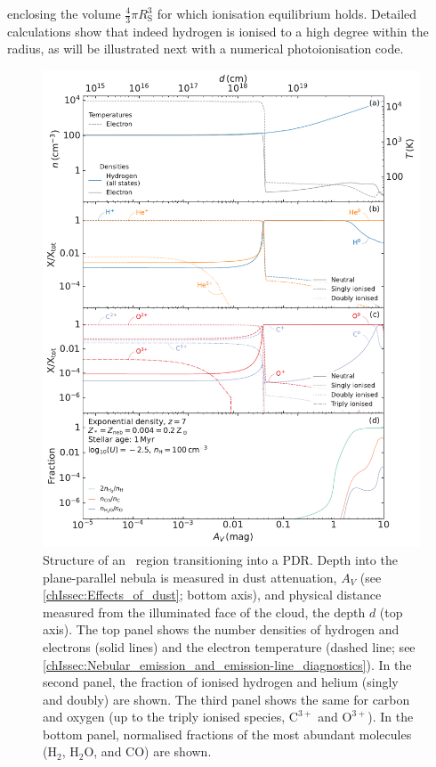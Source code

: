 \noindent enclosing the volume $\frac{4}{3} \pi R_\text{S}^3$ for which ionisation equilibrium holds. Detailed calculations show that indeed hydrogen is ionised to a high degree within the \citeauthor{1939ApJ....89..526S} radius, as will be illustrated next with a numerical photoionisation code.
\begin{figure}
    \centering
    \includegraphics[width=0.95\linewidth]{"Figs/Cloudy_PDR_structure"}
    \caption[Structure of an \HII\ region transitioning into a PDR]
    {Structure of an \HII\ region transitioning into a PDR. Depth into the plane-parallel nebula is measured in dust attenuation, $A_V$ (see \cref{chIssec:Effects_of_dust}; bottom axis), and physical distance measured from the illuminated face of the cloud, the depth $d$ (top axis). The top panel shows the number densities of hydrogen and electrons (solid lines) and the electron temperature (dashed line; see \cref{chIssec:Nebular_emission_and_emission-line_diagnostics}). In the second panel, the fraction of ionised hydrogen and helium (singly and doubly) are shown. The third panel shows the same for carbon and oxygen (up to the triply ionised species, $\mathrm{C^{3+}}$ and $\mathrm{O^{3+}}$). In the bottom panel, normalised fractions of the most abundant molecules ($\mathrm{H_2}$, $\mathrm{H_2 O}$, and $\mathrm{CO}$) are shown.}
    \label{chIfig:Cloudy_PDR_structure}
\end{figure}

